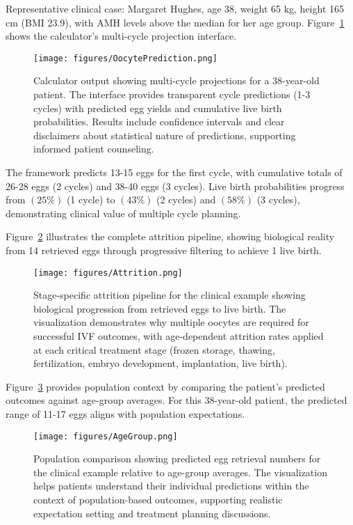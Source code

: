 \documentclass[pdflatex,sn-basic]{sn-jnl}%
\begin{document}
Representative clinical case: Margaret Hughes, age 38, weight 65 kg, height 165 cm (BMI 23.9), with AMH levels above the median for her age group. Figure~\ref{fig:oocyte_prediction} shows the calculator's multi-cycle projection interface.

\begin{figure}[H]
    \centering
    \texttt{[image: figures/OocytePrediction.png]}
    \caption{Calculator output showing multi-cycle projections for a 38-year-old patient. The interface provides transparent cycle predictions (1-3 cycles) with predicted egg yields and cumulative live birth probabilities. Results include confidence intervals and clear disclaimers about statistical nature of predictions, supporting informed patient counseling.}
    \label{fig:oocyte_prediction}
\end{figure}

The framework predicts 13-15 eggs for the first cycle, with cumulative totals of 26-28 eggs (2 cycles) and 38-40 eggs (3 cycles). Live birth probabilities progress from $(25\%)$ (1 cycle) to $(43\%)$ (2 cycles) and $(58\%)$ (3 cycles), demonstrating clinical value of multiple cycle planning.

Figure~\ref{fig:attrition} illustrates the complete attrition pipeline, showing biological reality from 14 retrieved eggs through progressive filtering to achieve 1 live birth.

\begin{figure}[H]
    \centering
    \texttt{[image: figures/Attrition.png]}
    \caption{Stage-specific attrition pipeline for the clinical example showing biological progression from retrieved eggs to live birth. The visualization demonstrates why multiple oocytes are required for successful IVF outcomes, with age-dependent attrition rates applied at each critical treatment stage (frozen storage, thawing, fertilization, embryo development, implantation, live birth).}
    \label{fig:attrition}
\end{figure}

Figure~\ref{fig:age_comparison} provides population context by comparing the patient's predicted outcomes against age-group averages. For this 38-year-old patient, the predicted range of 11-17 eggs aligns with population expectations.

\begin{figure}[H]
    \centering
    \texttt{[image: figures/AgeGroup.png]}
    \caption{Population comparison showing predicted egg retrieval numbers for the clinical example relative to age-group averages. The visualization helps patients understand their individual predictions within the context of population-based outcomes, supporting realistic expectation setting and treatment planning discussions.}
    \label{fig:age_comparison}
\end{figure}
\end{document}
